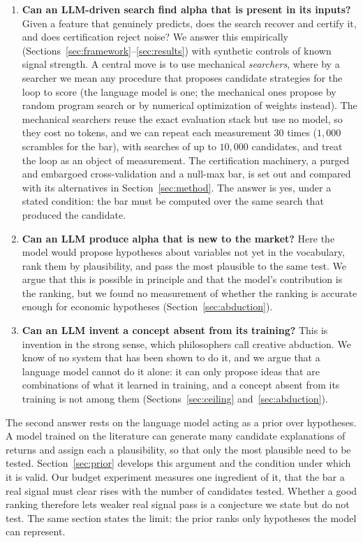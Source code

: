 \documentclass[11pt]{article}
\begin{document}
\begin{enumerate}[leftmargin=1.4em]
\item \textbf{Can an LLM-driven search find alpha that is present in its inputs?} Given a feature that
genuinely predicts, does the search recover and certify it, and does certification reject noise? We
answer this empirically (Sections~\ref{sec:framework}--\ref{sec:results}) with synthetic controls of
known signal strength. A central move is to use mechanical \emph{searchers}, where by a searcher we mean
any procedure that proposes candidate strategies for the loop to score (the language model is one; the
mechanical ones propose by random program search or by numerical optimization of weights instead). The mechanical searchers
reuse the exact evaluation stack but use no model, so they cost no tokens, and we can repeat each
measurement $30$ times ($1{,}000$ scrambles for the bar), with searches of up to $10{,}000$ candidates,
and treat the loop as an object of measurement. The certification machinery, a purged and embargoed
cross-validation and a null-max bar, is set out and compared with its
alternatives in Section~\ref{sec:method}. The answer is yes, under a stated condition: the bar must be
computed over the same search that produced the candidate.
\item \textbf{Can an LLM produce alpha that is new to the market?} Here the model would propose
hypotheses about variables not yet in the vocabulary, rank them by plausibility, and pass the most
plausible to the same test. We argue that this is possible in principle and that the model's
contribution is the ranking, but we found no measurement of whether the ranking is accurate enough for
economic hypotheses (Section~\ref{sec:abduction}).
\item \textbf{Can an LLM invent a concept absent from its training?} This is invention in the strong
sense, which philosophers call creative abduction. We know of no system that has been shown to do it,
and we argue that a language model cannot do it alone: it can only propose ideas that are
combinations of what it learned in training, and a concept absent from its training is not among them
(Sections~\ref{sec:ceiling} and~\ref{sec:abduction}).
\end{enumerate}

The second answer rests on the language model acting as a prior over hypotheses. A model trained on the
literature can generate many candidate explanations of returns and assign each a plausibility, so that
only the most plausible need to be tested. Section~\ref{sec:prior} develops this argument and the
condition under which it is valid. Our budget experiment measures one ingredient of it, that the bar a
real signal must clear rises with the number of candidates tested. Whether a good ranking therefore
lets weaker real signal pass is a conjecture we state but do not test. The same section states the
limit: the prior ranks only hypotheses the model can represent.
\end{document}
